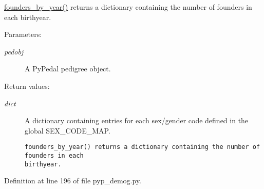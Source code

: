 \hyperlink{namespacePyPedal_1_1pyp__demog_b24de2bd6acca4c7b1f9a3a0fb7aaf21}{founders\_\-by\_\-year()} returns a dictionary containing the number of founders in each birthyear. 

\begin{Desc}
\item[Parameters:]
\begin{description}
\item[{\em pedobj}]A Py\-Pedal pedigree object. \end{description}
\end{Desc}
\begin{Desc}
\item[Return values:]
\begin{description}
\item[{\em dict}]A dictionary containing entries for each sex/gender code defined in the global SEX\_\-CODE\_\-MAP.

\footnotesize\begin{verbatim}founders_by_year() returns a dictionary containing the number of founders in each
birthyear.
\end{verbatim}
\normalsize
 \end{description}
\end{Desc}


Definition at line 196 of file pyp\_\-demog.py.